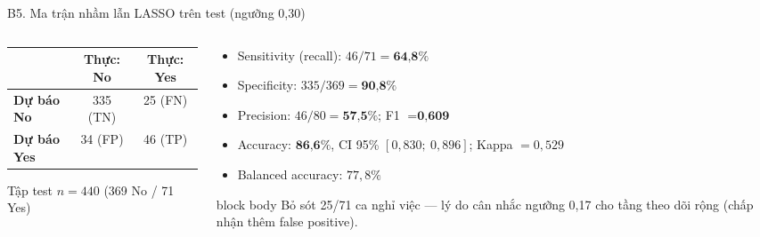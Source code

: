 \documentclass[10pt,aspectratio=169]{beamer}
\begin{document}
\begin{frame}{B5. Ma trận nhầm lẫn LASSO trên test (ngưỡng 0,30)}
  \begin{columns}[T,onlytextwidth]
    \begin{column}{0.44\textwidth}
      \centering\small
      \renewcommand{\arraystretch}{1.4}
      \begin{tabular}{l|cc}
        & \textbf{Thực: No} & \textbf{Thực: Yes}\\
        \hline
        \textbf{Dự báo No} & \cellcolor{HCMUSLight}335 (TN) & 25 (FN)\\
        \textbf{Dự báo Yes} & 34 (FP) & \cellcolor{HCMUSLight}46 (TP)\\
      \end{tabular}
      \vspace{0.2cm}

      \small Tập test $n = 440$ (369 No / 71 Yes)
    \end{column}
    \begin{column}{0.52\textwidth}
      \small
      \begin{itemize}
        \item Sensitivity (recall): $46/71 = \textbf{64,8\%}$
        \item Specificity: $335/369 = \textbf{90,8\%}$
        \item Precision: $46/80 = \textbf{57,5\%}$; F1 $= \textbf{0,609}$
        \item Accuracy: $\textbf{86,6\%}$, CI 95\% $[0{,}830;\ 0{,}896]$;
              Kappa $= 0{,}529$
        \item Balanced accuracy: $77{,}8\%$
      \end{itemize}
      \vspace{0.10cm}
      \begin{beamercolorbox}[sep=0.13cm,rounded=true]{block body}
        \small Bỏ sót 25/71 ca nghỉ việc --- lý do cân nhắc ngưỡng 0,17
        cho tầng theo dõi rộng (chấp nhận thêm false positive).
      \end{beamercolorbox}
    \end{column}
  \end{columns}
\end{frame}
\end{document}
